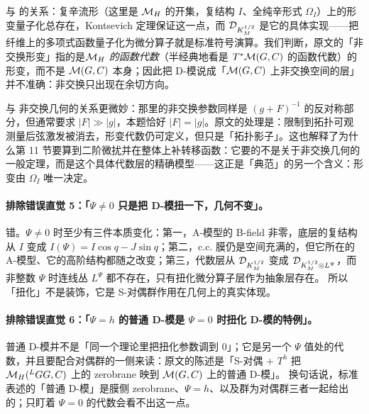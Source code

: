 与  的关系：复辛流形（这里是 \(\mathcal{M}_H\) 的开集，复结构 \(I\)、全纯辛形式 \(\Omega_I\)）上的形变量子化总存在，Kontsevich 定理保证这一点，而 \(\mathcal{D}_{K_M^{1/2}}\) 是它的具体实现——把纤维上的多项式函数量子化为微分算子就是标准符号演算。我们判断，原文的「非交换形变」指的是\emph{\(\mathcal{M}_H\) 的函数代数}（半经典地看是 \(T^*\mathcal{M}(G,C)\) 的函数代数）的形变，而不是 \(\mathcal{M}(G,C)\) 本身；因此把 D-模说成「\(\mathcal{M}(G,C)\) 上非交换空间的层」并不准确：非交换只出现在余切方向。\pB{}\pC{}

与  非交换几何的关系更微妙：那里的非交换参数同样是 \((g+F)^{-1}\) 的反对称部分，但通常要求 \(|F|\gg|g|\)，本题恰好 \(|F|=|g|\)。原文的处理是：限制到拓扑可观测量后弦激发被消去，形变代数仍可定义，但只是「拓扑影子」。这也解释了为什么第 11 节要算到二阶微扰并在整体上补转移函数：它要的不是关于非交换几何的一般定理，而是这个具体代数层的精确模型——这正是「典范」的另一个含义：形变由 \(\Omega_I\) 唯一决定。\pB{}\pC{}


\paragraph{排除错误直觉 5：「\(\Psi\neq0\) 只是把 D-模扭一下，几何不变」。}错。\(\Psi\neq0\) 时至少有三件本质变化：第一，A-模型的 B-field 非零，底层的复结构从 \(I\) 变成 \(I(\Psi)=I\cos q-J\sin q\)；第二，c.c. 膜仍是空间充满的，但它所在的 A-模型、它的高阶结构都随之改变；第三，代数层从 \(\mathcal{D}_{K_M^{1/2}}\) 变成 \(\mathcal{D}_{K_M^{1/2}\otimes L^{\Psi}}\)，而非整数 \(\Psi\) 时连线丛 \(L^{\Psi}\) 都不存在，只有扭化微分算子层作为抽象层存在。\pA{}\pA{} 所以「扭化」不是装饰，它是 S-对偶群作用在几何上的真实体现。

\paragraph{排除错误直觉 6：「\(\Psi=h\) 的普通 D-模是 \(\Psi=0\) 时扭化 D-模的特例」。}普通 D-模并不是「同一个理论里把扭化参数调到 0」；它是另一个 \(\Psi\) 值处的代数，并且要配合对偶群的一侧来读：原文的陈述是「S-对偶 \(+\) \(T^h\) 把 \(\mathcal{M}_H({}^{L}G G,C)\) 上的 zerobrane 映到 \(\mathcal{M}(G,C)\) 上的普通 D-模」。\pA{} 换句话说，标准表述的「普通 D-模」是膜侧 zerobrane、\(\Psi=h\)、以及群为对偶群三者一起给出的；只盯着 \(\Psi=0\) 的代数会看不出这一点。


